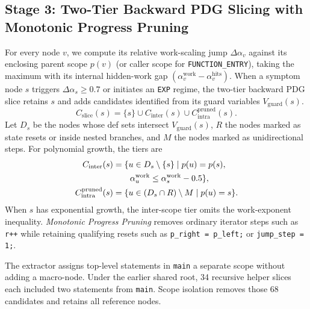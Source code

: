 \subsection{Stage 3: Two-Tier Backward PDG Slicing with Monotonic Progress Pruning}
For every node $v$, we compute its relative work-scaling jump $\Delta\alpha_v$ against its enclosing parent scope $p(v)$ (or caller scope for \texttt{FUNCTION\_ENTRY}), taking the maximum with its internal hidden-work gap $(\alpha_v^{\text{work}} - \alpha_v^{\text{hits}})$. When a symptom node $s$ triggers $\Delta\alpha_s \ge 0.7$ or initiates an \texttt{EXP} regime, the two-tier backward PDG slice retains $s$ and adds candidates identified from its guard variables $V_{\text{guard}}(s)$.
\begin{equation}
C_{\text{slice}}(s) = \{s\} \cup C_{\text{inter}}(s) \cup C_{\text{intra}}^{\text{pruned}}(s).
\end{equation}
Let $D_s$ be the nodes whose def sets intersect $V_{\text{guard}}(s)$, $R$ the nodes marked as state resets or inside nested branches, and $M$ the nodes marked as unidirectional steps. For polynomial growth, the tiers are
\begin{align}
C_{\text{inter}}(s) &= \{u \in D_s \setminus \{s\} \mid p(u)=p(s), \notag\\
&\qquad \alpha_u^{\text{work}} \le \alpha_s^{\text{work}}-0.5\}, \\
C_{\text{intra}}^{\text{pruned}}(s) &= \{u \in (D_s \cap R) \setminus M \mid p(u)=s\}.
\end{align}
When $s$ has exponential growth, the inter-scope tier omits the work-exponent inequality. \emph{Monotonic Progress Pruning} removes ordinary iterator steps such as \texttt{r++} while retaining qualifying resets such as \texttt{p\_right = p\_left;} or \texttt{jump\_step = 1;}.

The extractor assigns top-level statements in \texttt{main} a separate scope without adding a macro-node. Under the earlier shared root, 34 recursive helper slices each included two statements from \texttt{main}. Scope isolation removes those 68 candidates and retains all reference nodes.

